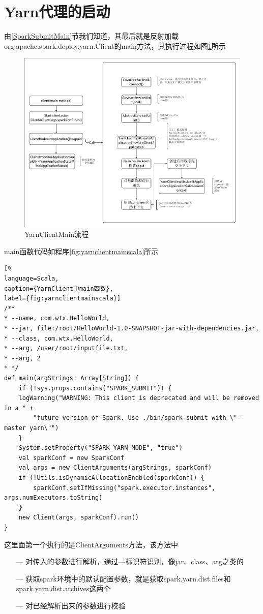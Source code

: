 \section{Yarn代理的启动}
由\ref{SparkSubmitMain}节我们知道，其最后就是反射加载org.apache.spark.deploy.yarn.Client的main方法，其执行过程如图\ref{fig:YarnClientMain}所示
	\begin{figure}[H] 
	\centering
	\includegraphics[width=\textwidth]{figures/YarnClientMain.pdf}
	\caption{YarnClientMain流程}
	\label{fig:YarnClientMain}
\end{figure}
main函数代码如程序\ref{fig:yarnclientmainscala}所示
\begin{lstlisting}[%
language=Scala,
caption={YarnClient中main函数},
label={fig:yarnclientmainscala}]
/**
* --name, com.wtx.HelloWorld,
* --jar, file:/root/HelloWorld-1.0-SNAPSHOT-jar-with-dependencies.jar,
* --class, com.wtx.HelloWorld,
* --arg, /user/root/inputfile.txt,
* --arg, 2
* */
def main(argStrings: Array[String]) {
	if (!sys.props.contains("SPARK_SUBMIT")) {
	logWarning("WARNING: This client is deprecated and will be removed in a " +
		"future version of Spark. Use ./bin/spark-submit with \"--master yarn\"")
	}
	System.setProperty("SPARK_YARN_MODE", "true")
	val sparkConf = new SparkConf
	val args = new ClientArguments(argStrings, sparkConf)
	if (!Utils.isDynamicAllocationEnabled(sparkConf)) {
		sparkConf.setIfMissing("spark.executor.instances", args.numExecutors.toString)
	}
	new Client(args, sparkConf).run()
}
\end{lstlisting}
这里面第一个执行的是ClientArguments方法，该方法中
\begin{itemize}
	\item[---] 对传入的参数进行解析，通过—标识符识别，像jar、class、arg之类的
	\item[---] 获取spark环境中的默认配置参数，就是获取spark.yarn.dist.files和spark.yarn.dist.archives这两个
	\item[---] 对已经解析出来的参数进行校验
\end{itemize}


